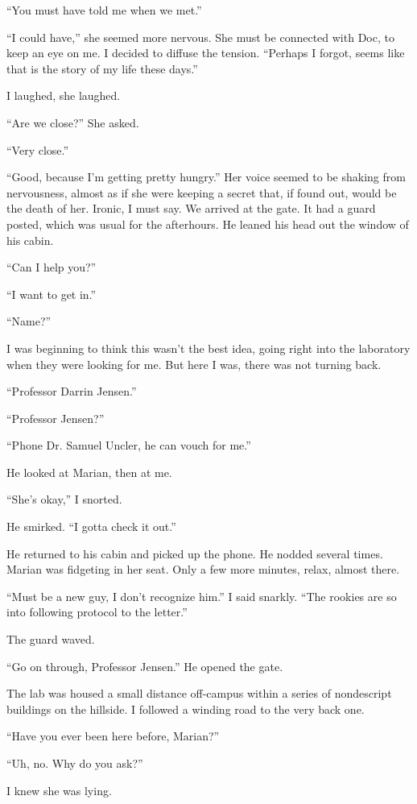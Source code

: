 ``You must have told me when we met.''

``I could have,'' she seemed more nervous. She must be connected with
Doc, to keep an eye on me. I decided to diffuse the tension. ``Perhaps I
forgot, seems like that is the story of my life these days.''

I laughed, she laughed.

``Are we close?'' She asked.

``Very close.''

``Good, because I'm getting pretty hungry.'' Her voice seemed to be
shaking from nervousness, almost as if she were keeping a secret that,
if found out, would be the death of her. Ironic, I must say. We arrived
at the gate. It had a guard posted, which was usual for the afterhours.
He leaned his head out the window of his cabin.

``Can I help you?''

``I want to get in.''

``Name?''

I was beginning to think this wasn't the best idea, going right into the
laboratory when they were looking for me. But here I was, there was not
turning back.

``Professor Darrin Jensen.''

``Professor Jensen?''

``Phone Dr. Samuel Uncler, he can vouch for me.''

He looked at Marian, then at me.

``She's okay,'' I snorted.

He smirked. ``I gotta check it out.''

He returned to his cabin and picked up the phone. He nodded several
times. Marian was fidgeting in her seat. Only a few more minutes, relax,
almost there.

``Must be a new guy, I don't recognize him.'' I said snarkly. ``The
rookies are so into following protocol to the letter.''

The guard waved.

``Go on through, Professor Jensen.'' He opened the gate.

The lab was housed a small distance off-campus within a series of
nondescript buildings on the hillside. I followed a winding road to the
very back one.

``Have you ever been here before, Marian?''

``Uh, no. Why do you ask?''

I knew she was lying.

